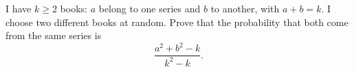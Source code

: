 I have $k\ge2$ books: $a$ belong to one series and $b$ to another, with $a+b=k$. I choose two different books at random. Prove that the probability that both come from the same series is
\[
\dfrac{a^2+b^2-k}{k^2-k}.
\]
